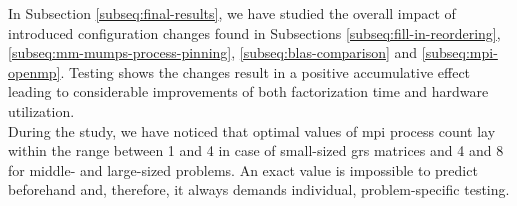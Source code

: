 



In Subsection \ref{subseq:final-results}, we have studied the overall impact of introduced configuration changes found in Subsections \ref{subseq:fill-in-reordering}, \ref{subseq:mm-mumps-process-pinning}, \ref{subseq:blas-comparison} and \ref{subseq:mpi-openmp}. Testing shows the changes result in a positive accumulative effect leading to considerable improvements of both factorization time and hardware utilization.\\



During the study, we have noticed that optimal values of \acrshort{mpi} process count lay within the range between 1 and 4 in case of small-sized \acrshort{grs} matrices and 4 and 8 for middle- and large-sized problems. An exact value is impossible to predict beforehand and, therefore, it always demands individual, problem-specific testing.\\
